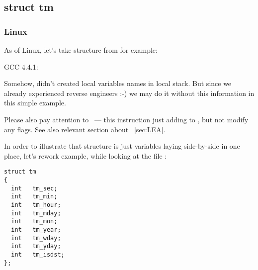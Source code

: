 \subsection{struct tm}

\subsubsection{Linux}

{As of Linux, let's take  structure from  for example:}



 GCC 4.4.1:

\IFRU{}{}

{Somehow, \IDA didn't created local variables names in local stack.
But since we already experienced reverse engineers :-) we may do it without this information in 
this simple example.}

{Please also pay attention to  ~--- this instruction just adding  to \EAX,
but not modify any flags. See also relevant section about \LEA{}~\ref{sec:LEA}.}

{In order to illustrate that structure is just variables laying side-by-side in one place, let's rework
example, while looking at the file} :

\begin{lstlisting}[caption=time.h]
struct tm
{
  int	tm_sec;
  int	tm_min;
  int	tm_hour;
  int	tm_mday;
  int	tm_mon;
  int	tm_year;
  int	tm_wday;
  int	tm_yday;
  int	tm_isdst;
};
\end{lstlisting}



